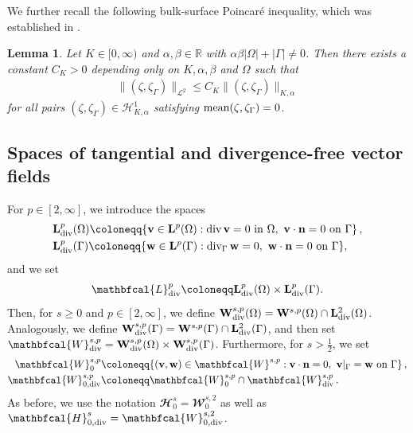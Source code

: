 \documentclass[11pt,reqno]{amsart}
\newtheorem{lemma}[theorem]{Lemma}
\theoremstyle{remark}
\numberwithin{equation}{section}
\newcommand{\abs}[1]{|#1|}
\newcommand{\norm}[1]{\| #1 \|}
\newcommand{\mean}[2]{\textnormal{mean}(#1,#2)}
\newcommand{\R}{\mathbb R}
\newcommand{\n}{\mathbf{n}}
\newcommand{\Div}{\textnormal{div}}
\newcommand{\Divg}{\textnormal{div}_\Ga}
\newcommand{\Om}{\Omega}
\newcommand{\Ga}{\Gamma}
\newcommand{\bv}{\mathbf v}
\newcommand{\bw}{\mathbf w}
\begin{document}
We further recall the following bulk-surface Poincar\'{e} inequality, which was established in \cite[Lemma A.1]{Knopf2021}.

\medskip

\begin{lemma}\label{Lemma:Poincare}
	Let $K\in[0,\infty)$ and $\alpha,\beta\in\R$ with $\alpha\beta\abs{\Om} + \abs{\Ga} \neq 0$. Then there exists a constant $C_K > 0$ depending only on $K,\alpha,\beta$ and $\Om$ such that
	\begin{align*}
		\norm{(\zeta,\zeta_\Ga)}_{\mathcal{L}^2} \leq C_K \norm{(\zeta,\zeta_\Ga)}_{K,\alpha}
	\end{align*}
	for all pairs $(\zeta,\zeta_\Ga)\in\mathcal{H}^1_{K,\alpha}$ satisfying $\mean{\zeta}{\zeta_\Ga} = 0$.
\end{lemma}


\subsection{Spaces of tangential and divergence-free vector fields}

For $p\in[2,\infty]$, we introduce the spaces 
\begin{align*}
	&\mathbf{L}^p_\Div(\Om) \coloneqq \{ \bv\in\mathbf{L}^p(\Om): \Div\,\bv = 0 \ \text{in~}\Om, \ \bv\cdot\n = 0 \ \text{on~}\Ga\} \,, \\
	&\mathbf{L}^p_\Div(\Ga) \coloneqq \{ \bw\in\mathbf{L}^p(\Ga): \Divg\,\bw = 0, \ \bw\cdot\n = 0 \ \text{on~}\Ga\},
\end{align*}
and we set
\begin{align*}
    \mathbfcal{L}^p_\Div \coloneqq \mathbf{L}^p_\Div(\Om)\times\mathbf{L}^p_\Div(\Ga).
\end{align*}
Then, for $s\geq 0$ and $p\in[2,\infty]$, we define $\mathbf{W}^{s,p}_\Div(\Om) = \mathbf{W}^{s,p}(\Om)\cap \mathbf{L}^2_\Div(\Om)$. Analogously, we define $\mathbf{W}^{s,p}_\Div(\Ga) = \mathbf{W}^{s,p}(\Ga)\cap \mathbf{L}^2_\Div(\Ga)$, and then set $\mathbfcal{W}^{s,p}_\Div = \mathbf{W}^{s,p}_\Div(\Om)\times\mathbf{W}^{s,p}_\Div(\Ga)$. Furthermore, for $s>\frac 12$, we set 
\begin{align*}
    \mathbfcal{W}^{s,p}_0 &\coloneqq \{(\bv,\bw)\in\mathbfcal{W}^{s,p}: \bv\cdot\n = 0, \ \bv\vert_\Ga = \bw \ \text{on~}\Ga\}\,,
    \\
    \mathbfcal{W}^{s,p}_{0,\Div} &\coloneqq \mathbfcal{W}^{s,p}_0 \cap \mathbfcal{W}^{s,p}_\Div \,.
\end{align*}
As before, we use the notation $\mathbfcal{H}^s_0 = \mathbfcal{W}^{s,2}_0$ as well as $\mathbfcal{H}^s_{0,\Div} = \mathbfcal{W}^{s,2}_{0,\Div}$. 
\end{document}
